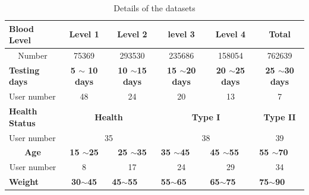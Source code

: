 \begin{table}[]
\small
\centering
\caption{Details of the datasets
}
\label{dateset}
\begin{tabular}{|l|c|c|c|c|c|l|}
\hline
\textbf{Blood Level}                  & \textbf{Level 1}        & \textbf{Level 2}                      & \textbf{level 3}                       & \textbf{Level 4}                       & \multicolumn{2}{c|}{\textbf{Total}}             \\ \hline
\multicolumn{1}{|c|}{Number}          & 75369                   & 293530                                & 235686                                 & 158054                                 & \multicolumn{2}{c|}{762639}                     \\ \hline
\textbf{Testing days}                 & \textbf{5 $\sim$ 10 days}   & \textbf{10 $\sim$15 days}            & \textbf{15 $\sim$20 days}             & \textbf{20 $\sim$25 days}             & \multicolumn{2}{c|}{\textbf{25 $\sim$30 days}} \\ \hline
User number                           & 48                      & 24                                    & 20                                     & 13                                     & \multicolumn{2}{c|}{7}                          \\ \hline
\textbf{Health Status}                & \multicolumn{2}{c|}{\textbf{Health}}                            & \multicolumn{2}{c|}{\textbf{Type I}}                                            & \multicolumn{2}{c|}{\textbf{Type II}}           \\ \hline
User number                           & \multicolumn{2}{c|}{35}                                         & \multicolumn{2}{c|}{38}                                                         & \multicolumn{2}{c|}{39}                         \\ \hline
\multicolumn{1}{|c|}{\textbf{Age}}    & \textbf{15 $\sim$25}       & \textbf{25 $\sim$35}                     & \multicolumn{1}{l|}{\textbf{35 $\sim$45}} & \multicolumn{1}{l|}{\textbf{45 $\sim$55}} & \multicolumn{2}{l|}{\textbf{55 $\sim$70}}          \\ \hline
\multicolumn{1}{|c|}{User number}     & 8                       & 17                                    & 24                                     & 29                                     & \multicolumn{2}{c|}{34}                         \\ \hline
\textbf{Weight}                       & \textbf{30$\sim$45}        & \multicolumn{1}{l|}{\textbf{45$\sim$55}} & \multicolumn{1}{l|}{\textbf{55$\sim$65}}  & \multicolumn{1}{l|}{\textbf{65$\sim$75}}  & \multicolumn{2}{l|}{\textbf{75$\sim$90}}           \\ \hline

\end{tabular}
\end{table}
